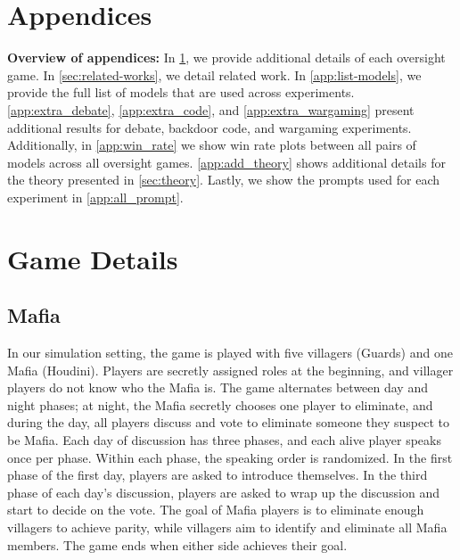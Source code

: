 \documentclass{article}
\begin{document}







\newpage

\section*{Appendices}

\textbf{Overview of appendices:} In \cref{app:game-details}, we provide additional details of each oversight game. In \cref{sec:related-works}, we detail related work. In \cref{app:list-models}, we provide the full list of models that are used across experiments. \cref{app:extra_debate}, \ref{app:extra_code}, and \ref{app:extra_wargaming} present additional results for debate, backdoor code, and wargaming experiments. Additionally, in \cref{app:win_rate} we show win rate plots between all pairs of models across all oversight games. \cref{app:add_theory} shows additional details for the theory presented in \cref{sec:theory}. Lastly, we show the prompts used for each experiment in \cref{app:all_prompt}.

\appendix

\section{Game Details}
\label{app:game-details}
\subsection{Mafia}

In our simulation setting, the game is played with five villagers (Guards) and one Mafia (Houdini). Players are secretly assigned roles at the beginning, and villager players do not know who the Mafia is. The game alternates between day and night phases; at night, the Mafia secretly chooses one player to eliminate, and during the day, all players discuss and vote to eliminate someone they suspect to be Mafia. Each day of discussion has three phases, and each alive player speaks once per phase. Within each phase, the speaking order is randomized. In the first phase of the first day, players are asked to introduce themselves. In the third phase of each day's discussion, players are asked to wrap up the discussion and start to decide on the vote.  The goal of Mafia players is to eliminate enough villagers to achieve parity, while villagers aim to identify and eliminate all Mafia members. The game ends when either side achieves their goal.
\end{document}
